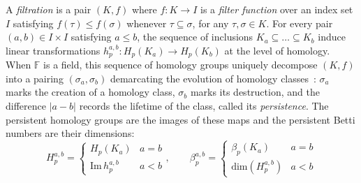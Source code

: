 A \emph{filtration} is a pair $(K, f)$ where $f : K \to I$ is a \emph{filter function} over an index set $I$ satisfying $f(\tau) \leq f(\sigma)$ whenever $\tau \subseteq \sigma$, for any $\tau,\sigma \in K$. 
For every pair $(a,b) \in I \times I$ satisfying $a \leq b$, the sequence of inclusions $K_a \subseteq \dots \subseteq K_b$ induce linear transformations $h_p^{a,b} :  H_p(K_a) \to H_p(K_b)$ at the level of homology.
When $\mathbb{F}$ is a field, this sequence of homology groups uniquely decompose $(K,f)$ into a pairing $(\sigma_a, \sigma_b)$ demarcating the evolution of homology classes~\cite{zomorodian2004computing}: $\sigma_a$ marks the creation of a homology class, $\sigma_b$ marks its destruction, and the difference $\lvert a - b \rvert$ records the lifetime of the class, called its \emph{persistence}.
The persistent homology groups are the images of these maps and the persistent Betti numbers are their dimensions:
\begin{equation}
	H_{p}^{a,b} = \begin{cases}
	H_p(K_a) & a = b \\ 
 	\mathrm{Im}\,h_p^{a,b} & a < b
 \end{cases}
, \quad \quad 
\beta_p^{a,b} = \begin{cases}
 	\beta_p(K_a) & a = b \\
 	\mathrm{dim}(H_{p}^{a,b}) & a < b
 \end{cases}
\end{equation}
